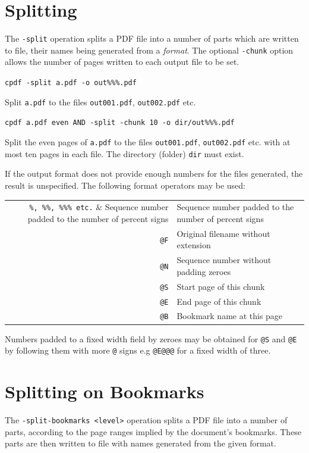 \documentclass{book}
\begin{document}
  \section{Splitting}
   The \texttt{-split} operation splits a PDF file into a number of parts which
are written to file, their names being generated from a \emph{format}. The
optional \texttt{-chunk} option allows the number of pages written to each
output file to be set. 
  \begin{framed}\small
    \noindent\verb!cpdf -split a.pdf -o out%%%.pdf!

    \vspace{2.5mm}
    \noindent Split \texttt{a.pdf} to the files \texttt{out001.pdf}, \texttt{out002.pdf} etc.

    \vspace{2.5mm}
    \noindent\verb!cpdf a.pdf even AND -split -chunk 10 -o dir/out%%%.pdf!

    \vspace{2.5mm}
    \noindent Split the even pages of \texttt{a.pdf} to the files
\texttt{out001.pdf}, \texttt{out002.pdf} etc. with at most ten pages in each
file. The directory (folder) \texttt{dir} must exist.
  \end{framed}
\noindent If the output format does not provide enough numbers for the files generated,
the result is unspecified. The following format operators may be used:

\begin{center}
\begin{tabular}{rl}
  \verb!%, %%, %%% etc.! & Sequence number padded to the number of percent signs\\
  \texttt{@F} & Original filename without extension \\
  \texttt{@N} & Sequence number without padding zeroes \\
  \texttt{@S} & Start page of this chunk \\
  \texttt{@E} & End page of this chunk \\
  \texttt{@B} & Bookmark name at this page \\
\end{tabular}
\end{center}

\noindent Numbers padded to a fixed width field by zeroes may be obtained for \texttt{@S} and \texttt{@E} by following them with more \texttt{@} signs e.g \texttt{@E@@@} for a fixed width of three.

  \section{Splitting on Bookmarks}
  The \texttt{-split-bookmarks <level>} operation splits a PDF file into a number of
parts, according to the page ranges implied by the document's bookmarks. These
parts are then written to file with names generated from the given format.
  
\end{document}
